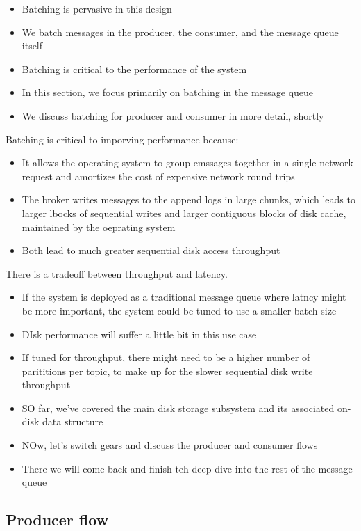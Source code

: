 \documentclass{report}
\theoremstyle{definition}
\let\oldsubsection\subsection
\renewcommand{\subsection}{\oldsubsection*}
\begin{document}
\begin{itemize}
\item
Batching is pervasive in this design
\item
We batch messages in the producer, the consumer, and the message queue itself
\item
Batching is critical to the performance of the system
\item
In this section, we focus primarily on batching in the message queue
\item
We discuss batching for producer and consumer in more detail, shortly
\end{itemize}

Batching is critical to imporving performance because:

\begin{itemize}
\item
It allows the operating system to group emssages together in a single network request and amortizes the cost of expensive network round trips
\item
The broker writes messages to the append logs in large chunks, which leads to larger lbocks of sequential writes and larger contiguous blocks of disk cache, maintained by the oeprating system
\item
Both lead to much greater sequential disk access throughput
\end{itemize}

There is a tradeoff between throughput and latency.

\begin{itemize}
\item
If the system is deployed as a traditional message queue where latncy might be more important, the system could be tuned to use a smaller batch size
\item
DIsk performance will suffer a little bit in this use case
\item
If tuned for throughput, there might need to be a higher number of  parititions per topic, to make up for the slower sequential disk write throughput
\item
SO far, we've covered the main disk storage subsystem and its associated on-disk data structure
\item
NOw, let's switch gears and discuss the producer and consumer flows
\item
There we will come back and finish teh deep dive into the rest of the message queue
\end{itemize}

\subsection{Producer flow}
\end{document}
